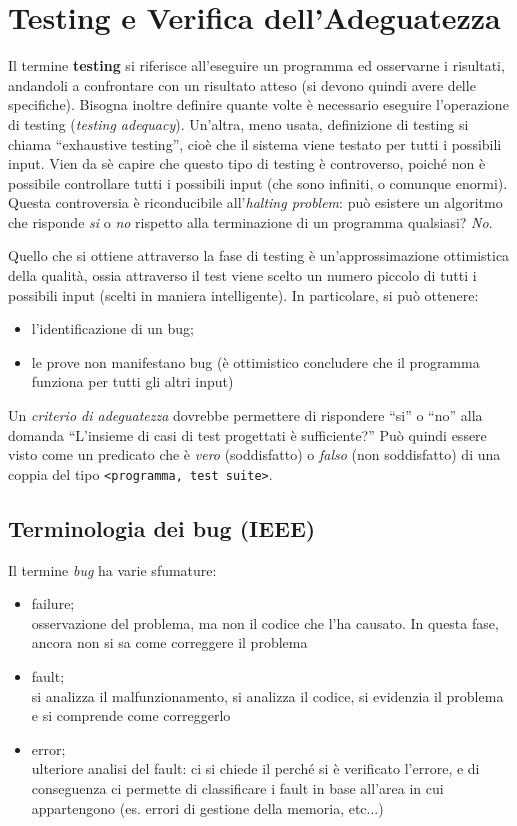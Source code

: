 \newpage
\section{Testing e Verifica dell'Adeguatezza}

Il termine \textbf{testing} si riferisce all'eseguire un programma ed osservarne i risultati, andandoli a confrontare con un risultato atteso (si devono quindi avere delle specifiche). Bisogna inoltre definire quante volte è necessario eseguire l'operazione di testing (\textit{testing adequacy}). Un'altra, meno usata, definizione di testing si chiama ``exhaustive testing'', cioè che il sistema viene testato per tutti i possibili input. Vien da sè capire che questo tipo di testing è controverso, poiché non è possibile controllare tutti i possibili input (che sono infiniti, o comunque enormi). Questa controversia è riconducibile all'\textit{halting problem}: può esistere un algoritmo che risponde \textit{si} o \textit{no} rispetto alla terminazione di un programma qualsiasi? \textit{No}.

Quello che si ottiene attraverso la fase di testing è un'approssimazione ottimistica della qualità, ossia attraverso il test viene scelto un numero piccolo di tutti i possibili input (scelti in maniera intelligente). In particolare, si può ottenere: \begin{itemize}
    \item l'identificazione di un bug;
    \item le prove non manifestano bug (è ottimistico concludere che il programma funziona per tutti gli altri input)
\end{itemize}

Un \textit{criterio di adeguatezza} dovrebbe permettere di rispondere ``si'' o ``no'' alla domanda ``L'insieme di casi di test progettati è sufficiente?'' Può quindi essere visto come un predicato che è \textit{vero} (soddisfatto) o \textit{falso} (non soddisfatto) di una coppia del tipo \texttt{<programma, test suite>}.

\subsection{Terminologia dei bug (IEEE)}

Il termine \textit{bug} ha varie sfumature: \begin{itemize}
    \item failure; \\ osservazione del problema, ma non il codice che l'ha causato. In questa fase, ancora non si sa come correggere il problema
    \item fault; \\ si analizza il malfunzionamento, si analizza il codice, si evidenzia il problema e si comprende come correggerlo
    \item error; \\ ulteriore analisi del fault: ci si chiede il perché si è verificato l'errore, e di conseguenza ci permette di classificare i fault in base all'area in cui appartengono (es. errori di gestione della memoria, etc...)
\end{itemize}

